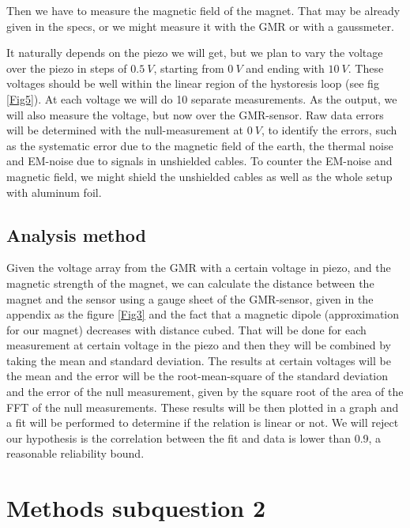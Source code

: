 \documentclass[a4paper,11pt]{article} %
\begin{document}
Then we have to measure the magnetic field of the magnet. That may be already given in the specs, or we might measure it with the GMR or with a gaussmeter. 


It naturally depends on the piezo we will get, but we plan to vary the voltage over the piezo in steps of $\SI{0.5}{V}$, starting from $\SI{0}{V}$ and ending with $\SI{10}{V}$. These voltages should be well within the linear region of the hystoresis loop (see fig \ref{Fig5}). At each voltage we will do 10 separate measurements. As the output, we will also measure the voltage, but now over the GMR-sensor. Raw data errors will be determined with the null-measurement at $\SI{0}{V}$, to identify the errors, such as the systematic error due to the magnetic field of the earth, the thermal noise and EM-noise due to signals in unshielded cables. To counter the EM-noise and magnetic field, we might shield the unshielded cables as well as the whole setup with aluminum foil.

\subsection{Analysis method}

Given the voltage array from the GMR with a certain voltage in piezo, and the magnetic strength of the magnet, we can calculate the distance between the magnet and the sensor using a gauge sheet of the GMR-sensor, given in the appendix as the figure \ref{Fig3} and the fact that a magnetic dipole (approximation for our magnet) decreases with distance cubed.
\newline
That will be done for each measurement at certain voltage in the piezo and then they will be combined by taking the mean and standard deviation. The results at certain voltages will be the mean and the error will be the root-mean-square of the standard deviation and the error of the null measurement, given by the square root of the area of the FFT of the null measurements. These results will be then plotted in a graph and a fit will be performed to determine if the relation is linear or not. We will reject our hypothesis is the correlation between the fit and data is lower than 0.9, a reasonable reliability bound.


\section{Methods subquestion 2}
\end{document}
